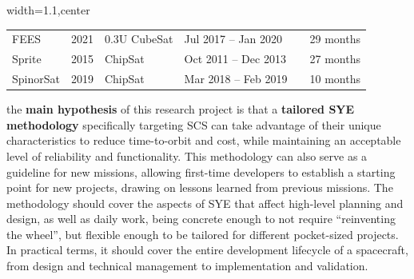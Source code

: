 \documentclass[a4paper,nobib,justified,final]{tufte-book}
\begin{document}
\begin{table}[b]
\begin{adjustbox}{width=1.1\linewidth,center}
\begin{tabularx}{\linewidth}{@{}llll@{\hskip 0.5em}lX@{}}
			FEES & 2021 & 0.3U CubeSat & Jul 2017 -- Jan 2020 & \cite{surelCubeSatInorbitTechnology2019} & 29 months \\
			Sprite & 2015 & ChipSat & Oct 2011 -- Dec 2013 & \cite{manchesterKickSatYourPersonal2016} & 27 months \\
			SpinorSat & 2019 & ChipSat & Mar 2018 -- Feb 2019 & \cite{brashearsSpinorSatStep502018} & 10 months \\ \bottomrule
		\end{tabularx}
	\end{adjustbox}
\end{table}

 the \textbf{main hypothesis} of this research project is that a \textbf{tailored \acl{SYE} methodology} specifically targeting \acf{SCS} can take advantage of their unique characteristics to reduce time-to-orbit and cost, while maintaining an acceptable level of reliability and functionality. This methodology can also serve as a guideline for new missions, allowing first-time developers to establish a starting point for new projects, drawing on lessons learned from previous missions. The methodology should cover the aspects of \acl{SYE} that affect high-level planning and design, as well as daily work, being concrete enough to not require ``reinventing the wheel'', but flexible enough to be tailored for different pocket-sized projects. In practical terms, it should cover the entire development lifecycle of a spacecraft, from design and technical management to implementation and validation.
\end{document}
